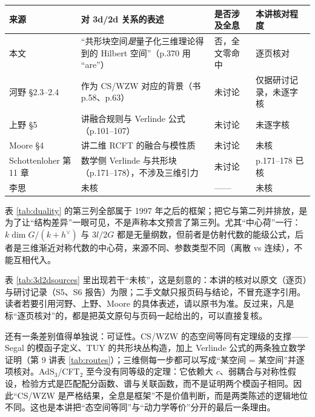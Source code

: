 \begin{center}
\begin{minipage}{\linewidth}
\centering
{}
\label{tab:3d2dsources}
\small
\small
\setlength{\tabcolsep}{3pt}
\begin{tabular}{@{}>{\raggedright\arraybackslash}p{2.7cm} >{\raggedright\arraybackslash}p{6.6cm} >{\raggedright\arraybackslash}p{2.9cm} >{\raggedright\arraybackslash}p{2.8cm}@{}}
\toprule
来源 & 对 3d/2d 关系的表述 & 是否涉及全息 & 本讲核对程度 \\
\midrule
本文 & “共形块空间\emph{是}量子化三维理论得到的 Hilbert 空间”（p.370 用 “are”） & 否，全文零命中 & 逐页核对 \\
河野 \S2.3--2.4 & 作为 CS/WZW 对应的背景（书 p.58、p.63） & 未讨论 & 仅据研讨记录，未逐字核 \\
上野 \S5 & 讲融合规则与 Verlinde 公式（p.101--107） & 未讨论 & 未逐字核 \\
Moore \S4 & 讲二维 RCFT 的融合与模性质 & 未讨论 & 未核 \\
Schottenloher 第 11 章 & 数学侧 Verlinde 与共形块（p.171--178），不涉及三维引力 & 未讨论 & p.171--178 已核 \\
李思 & 未核 & —— & 未核 \\
\bottomrule
\end{tabular}
\end{minipage}
\end{center}

表 \ref{tab:duality} 的第三列全部属于 1997 年之后的框架；把它与第二列并排放，是为了让“结构差异”一眼可见，不是声称本文预言了第三列。尤其“中心荷”一行：$k\dim G/(k+h^\vee)$ 与 $3l/2G$ 都是无量纲数，但前者是仿射代数的能级公式，后者是三维渐近对称代数的中心荷，来源不同、参数类型不同（离散 vs 连续），不能互相代入。

表 \ref{tab:3d2dsources} 里出现若干“未核”，这是刻意的：本讲的核对以原文（逐页）与研讨记录（S5、S6 报告）为限；二手文献只报页码与结论，不冒充逐字引用。读者若要引用河野、上野、Moore 的具体表述，请以原书为准。反过来，凡是标“逐页核对”的，都是把英文原句与页码一起给出的，可以直接复核。

还有一条差别值得单独说：可证性。CS/WZW 的态空间等同有定理级的支撑——Segal 的模函子定义、TUY 的共形块丛构造，加上 Verlinde 公式的两条独立数学证明（第 9 讲表 \ref{tab:routes}）；三维侧每一步都可以写成“某空间 = 某空间”并逐项核对。AdS$_3$/CFT$_2$ 至今没有同等级的定理：它依赖大 $c$、弱耦合与对称性假设，检验方式是匹配配分函数、谱与关联函数，而不是证明两个模函子相同。因此“CS/WZW 是严格结果，全息是框架”不是价值判断，而是两类陈述的逻辑地位不同。这也是本讲把“态空间等同”与“动力学等价”分开的最后一条理由。\ours

